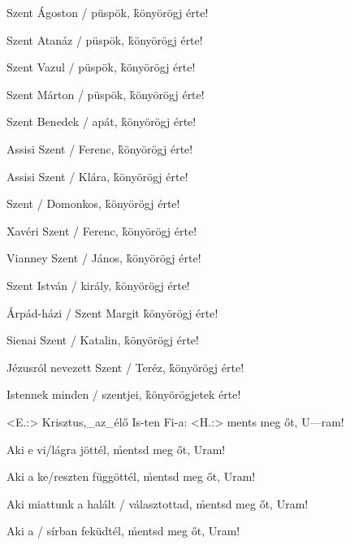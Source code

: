 \documentclass[twoside]{article}
\begin{document}
\e Szent Ágoston / püspök,                            \hfill\h könyörögj érte!

\e Szent Atanáz / püspök,                             \hfill\h könyörögj érte!

\e Szent Vazul / püspök,                              \hfill\h könyörögj érte!

\e Szent Márton / püspök,                             \hfill\h könyörögj érte!

\e Szent Benedek / apát,                              \hfill\h könyörögj érte!

\e Assisi Szent / Ferenc,                             \hfill\h könyörögj érte!

\e Assisi Szent / Klára,                              \hfill\h könyörögj érte!

\e Szent / Domonkos,                                  \hfill\h könyörögj érte!

\e Xavéri Szent / Ferenc,                             \hfill\h könyörögj érte!

\e Vianney Szent / János,                             \hfill\h könyörögj érte!

\e Szent István / király,                             \hfill\h könyörögj érte!

\e Árpád-házi / Szent Margit                          \hfill\h könyörögj érte!

\e Sienai Szent / Katalin,                            \hfill\h könyörögj érte!

\e Jézusról nevezett Szent / Teréz,                   \hfill\h könyörögj érte!

\e Istennek minden / szentjei,                        \hfill\h könyörögjetek érte!

\begin{gregosheet}
            {   <E.:> Krisztus,_az_élő Is-ten Fi-a: <H.:> ments meg őt, U---ram!}
\end{gregosheet}


\e Aki e vi/lágra jöttél,                           \hfill\h mentsd meg őt, Uram!

\e Aki a ke/reszten függöttél,                      \hfill\h mentsd meg őt, Uram!

\e Aki miattunk a halált / választottad,            \hfill\h mentsd meg őt, Uram!

\e Aki a / sírban feküdtél,                         \hfill\h mentsd meg őt, Uram!
\end{document}
